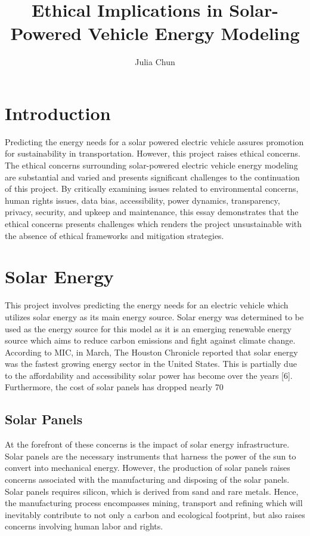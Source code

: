 \documentclass[10pt,twocolumn]{article}
\title{Ethical Implications in Solar-Powered Vehicle Energy Modeling}
\author{Julia Chun}
\affiliation{Occidental College}
\begin{document}
\maketitle

\section{Introduction}
Predicting the energy needs for a solar powered electric vehicle assures promotion for sustainability in transportation. However, this project raises ethical concerns. The ethical concerns surrounding solar-powered electric vehicle energy modeling are substantial and varied and presents significant challenges to the continuation of this project. By critically examining issues related to environmental concerns, human rights issues, data bias, accessibility, power dynamics, transparency, privacy, security, and upkeep and maintenance, this essay demonstrates that the ethical concerns presents challenges which renders the project unsustainable with the absence of ethical frameworks and mitigation strategies. 
\section{Solar Energy}
This project involves predicting the energy needs for an electric vehicle which utilizes solar energy as its main energy source. Solar energy was determined to be used as the energy source for this model as it is an emerging renewable energy source which aims to reduce carbon emissions and fight against climate change. According to MIC, in March, The Houston Chronicle reported that solar energy was the fastest growing energy sector in the United States. This is partially due to the affordability and accessibility solar power has become over the years [6]. Furthermore, the cost of solar panels has dropped nearly 70%
\subsection{Solar Panels}
At the forefront of these concerns is the impact of solar energy infrastructure. Solar panels are the necessary instruments that harness the power of the sun to convert into mechanical energy. However, the production of solar panels raises concerns associated with the manufacturing and disposing of the solar panels. Solar panels requires silicon, which is derived from sand  and rare metals. Hence, the manufacturing process encompasses mining, transport and refining which will inevitably contribute to not only a carbon and ecological footprint, but also raises concerns involving human labor and rights. 
\end{document}

